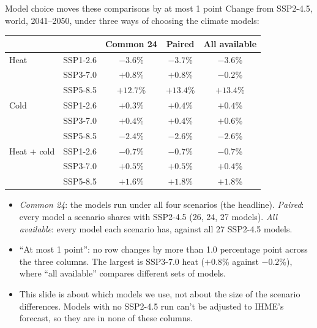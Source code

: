 \documentclass[aspectratio=169,11pt]{beamer}
\begin{document}
\begin{frame}{Model choice moves these comparisons by at most 1 point}
  \footnotesize
  Change from SSP2-4.5, world, 2041--2050, under three ways of choosing the climate models:

  \smallskip
  \centering
  \scriptsize\renewcommand{\arraystretch}{0.8}
  \begin{tabular}{llccc}
    \toprule
    & & Common 24 & Paired & All available \\
    \midrule
    Heat & SSP1-2.6 & $-3.6$\% & $-3.7$\% & $-3.6$\% \\
         & SSP3-7.0 & $+0.8$\% & $+0.8$\% & $-0.2$\% \\
         & SSP5-8.5 & $+12.7$\% & $+13.4$\% & $+13.4$\% \\
    Cold & SSP1-2.6 & $+0.3$\% & $+0.4$\% & $+0.4$\% \\
         & SSP3-7.0 & $+0.4$\% & $+0.4$\% & $+0.6$\% \\
         & SSP5-8.5 & $-2.4$\% & $-2.6$\% & $-2.6$\% \\
    Heat + cold & SSP1-2.6 & $-0.7$\% & $-0.7$\% & $-0.7$\% \\
         & SSP3-7.0 & $+0.5$\% & $+0.5$\% & $+0.4$\% \\
         & SSP5-8.5 & $+1.6$\% & $+1.8$\% & $+1.8$\% \\
    \bottomrule
  \end{tabular}

  \smallskip
  \raggedright\scriptsize
  \begin{itemize}
    \item \emph{Common 24}: the models run under all four scenarios (the headline). \emph{Paired}: every model a scenario shares with SSP2-4.5 (26, 24, 27 models). \emph{All available}: every model each scenario has, against all 27 SSP2-4.5 models.
    \item ``At most 1 point'': no row changes by more than 1.0 percentage point across the three columns. The largest is SSP3-7.0 heat ($+0.8$\% against $-0.2$\%), where ``all available'' compares different sets of models.
    \item This slide is about which models we use, not about the size of the scenario differences. Models with no SSP2-4.5 run can't be adjusted to IHME's forecast, so they are in none of these columns.
  \end{itemize}
\end{frame}
\end{document}
